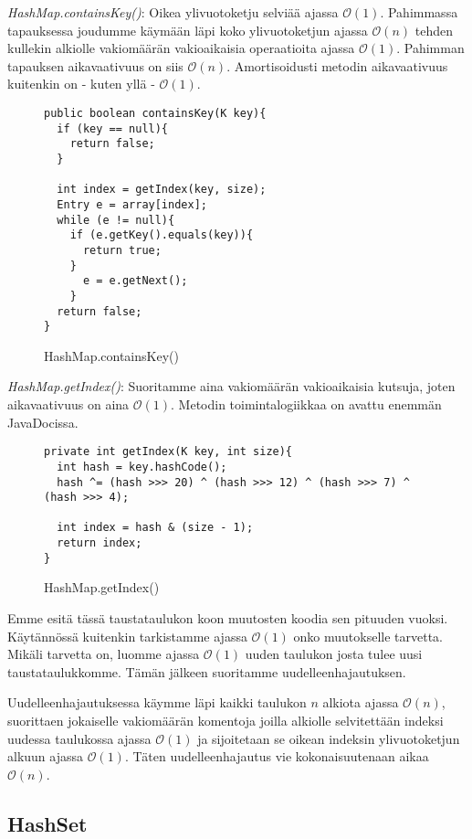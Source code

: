 \documentclass[12pt,a4paper]{article}
\begin{document}
\textit{HashMap.containsKey()}: Oikea ylivuotoketju selviää ajassa $\mathcal{O}(1)$. Pahimmassa tapauksessa joudumme käymään läpi koko ylivuotoketjun ajassa $\mathcal{O}(n)$ tehden kullekin alkiolle vakiomäärän vakioaikaisia operaatioita ajassa $\mathcal{O}(1)$. Pahimman tapauksen aikavaativuus on siis $\mathcal{O}(n)$. Amortisoidusti metodin aikavaativuus kuitenkin on - kuten yllä - $\mathcal{O}(1)$. 
\begin{figure}[H]
\begin{lstlisting}
public boolean containsKey(K key){
  if (key == null){
    return false;
  }
        
  int index = getIndex(key, size);
  Entry e = array[index];
  while (e != null){
    if (e.getKey().equals(key)){
      return true;
    }
      e = e.getNext();
    }
  return false;
}
\end{lstlisting}
\caption{HashMap.containsKey()}
\end{figure}

\textit{HashMap.getIndex()}: Suoritamme aina vakiomäärän vakioaikaisia kutsuja, joten aikavaativuus on aina $\mathcal{O}(1)$. Metodin toimintalogiikkaa on avattu enemmän JavaDocissa.
\begin{figure}[H]
\begin{lstlisting}
private int getIndex(K key, int size){
  int hash = key.hashCode();
  hash ^= (hash >>> 20) ^ (hash >>> 12) ^ (hash >>> 7) ^ (hash >>> 4); 
        
  int index = hash & (size - 1);
  return index;
}
\end{lstlisting}
\caption{HashMap.getIndex()}
\end{figure}

Emme esitä tässä taustataulukon koon muutosten koodia sen pituuden vuoksi. Käytännössä kuitenkin tarkistamme ajassa $\mathcal{O}(1)$ onko muutokselle tarvetta. Mikäli tarvetta on, luomme ajassa $\mathcal{O}(1)$ uuden taulukon josta tulee uusi taustataulukkomme. Tämän jälkeen suoritamme uudelleenhajautuksen.

Uudelleenhajautuksessa käymme läpi kaikki taulukon $n$ alkiota ajassa $\mathcal{O}(n)$, suorittaen jokaiselle vakiomäärän komentoja joilla alkiolle selvitettään indeksi uudessa taulukossa ajassa $\mathcal{O}(1)$ ja sijoitetaan se oikean indeksin ylivuotoketjun alkuun ajassa $\mathcal{O}(1)$. Täten uudelleenhajautus vie kokonaisuutenaan aikaa $\mathcal{O}(n)$.

\pagebreak
\subsection{HashSet}
\end{document}
